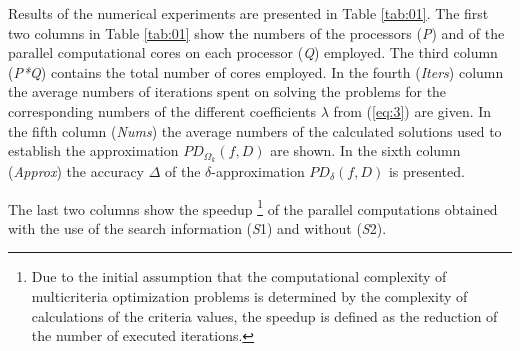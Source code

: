 Results of the numerical experiments are presented in Table \ref{tab:01}. The first two columns in Table \ref{tab:01} show the numbers of the processors (\textit{P}) and of the parallel computational cores on each processor (\textit{Q}) employed. The third column (\textit{P*Q}) contains the total number of cores employed. In the fourth (\textit{Iters}) column the average numbers of iterations spent on solving the problems for the corresponding numbers of the different coefficients $\lambda$ from (\ref{eq:3}) are given. In the fifth column (\textit{Nums}) the average numbers of the calculated solutions used to establish the approximation $PD_{\Omega_k}(f,D)$ are shown. In the sixth column (\textit{Approx}) the accuracy $\Delta$ of the $\delta$-approximation $PD_\delta(f,D)$ is presented.

The last two columns show the speedup \footnote{Due to the initial assumption that the computational complexity of multicriteria optimization problems is determined by the complexity of calculations of the criteria values, the speedup is defined as the reduction of the number of  executed iterations.} of the parallel computations obtained with the use of the search information (\textit{S}1) and without (\textit{S}2).

